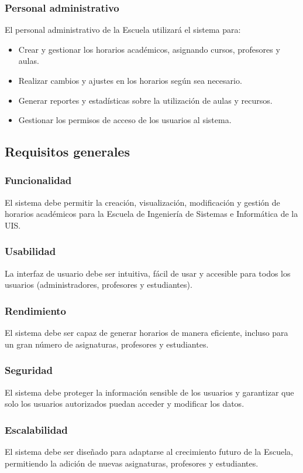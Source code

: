 \documentclass{article} %
\begin{document}
    \subsubsection{Personal administrativo}
    \noindent
    El personal administrativo de la Escuela utilizará el sistema para:
    \begin{itemize}
        \item Crear y gestionar los horarios académicos, asignando cursos, profesores y aulas.
        \item Realizar cambios y ajustes en los horarios según sea necesario.
        \item Generar reportes y estadísticas sobre la utilización de aulas y recursos.
        \item Gestionar los permisos de acceso de los usuarios al sistema.    
    \end{itemize}

\subsection{Requisitos generales}
    \subsubsection{Funcionalidad}
    \noindent
    El sistema debe permitir la creación, visualización, modificación y gestión de horarios académicos para la Escuela de Ingeniería de Sistemas e Informática de la UIS.
    \subsubsection{Usabilidad}
    \noindent
    La interfaz de usuario debe ser intuitiva, fácil de usar y accesible para todos los usuarios (administradores, profesores y estudiantes).
    \subsubsection{Rendimiento}
    \noindent
    El sistema debe ser capaz de generar horarios de manera eficiente, incluso para un gran número de asignaturas, profesores y estudiantes.
    \subsubsection{Seguridad}
    \noindent
    El sistema debe proteger la información sensible de los usuarios y garantizar que solo los usuarios autorizados puedan acceder y modificar los datos.
    \subsubsection{Escalabilidad}
    \noindent
    El sistema debe ser diseñado para adaptarse al crecimiento futuro de la Escuela, permitiendo la adición de nuevas asignaturas, profesores y estudiantes.
\end{document}
